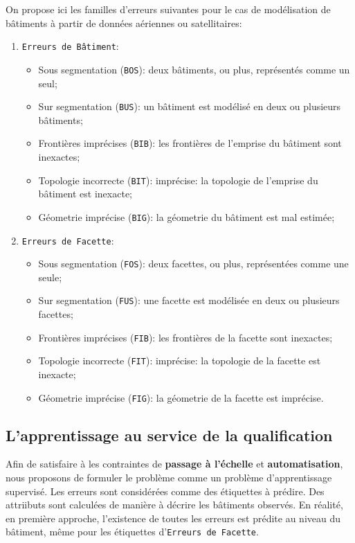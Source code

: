         On propose ici les familles d'erreurs suivantes pour le cas de modélisation de bâtiments à partir de données aériennes ou satellitaires:

        \begin{enumerate}
            \item \texttt{Erreurs de Bâtiment}:
            \begin{itemize}
                \item Sous segmentation (\texttt{BOS}): deux bâtiments, ou plus, représentés comme un seul;
                \item Sur segmentation (\texttt{BUS}): un bâtiment est modélisé en deux ou plusieurs bâtiments;
                \item Frontières imprécises (\texttt{BIB}): les frontières de l'emprise du bâtiment sont inexactes;
                \item Topologie incorrecte (\texttt{BIT}): imprécise: la topologie de l'emprise du bâtiment est inexacte;
                \item Géometrie imprécise (\texttt{BIG}): la géometrie du bâtiment est mal estimée;
            \end{itemize}
            \item \texttt{Erreurs de Facette}:
            \begin{itemize}
                \item Sous segmentation (\texttt{FOS}): deux facettes, ou plus, représentées comme une seule;
                \item Sur segmentation (\texttt{FUS}): une facette est modélisée en deux ou plusieurs facettes;
                \item Frontières imprécises (\texttt{FIB}): les frontières de la facette sont inexactes;
                \item Topologie incorrecte (\texttt{FIT}): imprécise: la topologie de la facette est inexacte;
                \item Géometrie imprécise (\texttt{FIG}): la géometrie de la facette est imprécise.
            \end{itemize}
        \end{enumerate}

    \subsection*{L'apprentissage au service de la qualification}
        Afin de satisfaire à les contraintes de \textbf{passage à l'échelle} et \textbf{automatisation}, nous proposons de formuler le problème comme un problème d'apprentissage supervisé.
        Les erreurs sont considérées comme des étiquettes à prédire.
        Des attriibuts sont calculées de manière à décrire les bâtiments observés.
        En réalité, en première approche, l'existence de toutes les erreurs est prédite au niveau du bâtiment, même pour les étiquettes d'\texttt{Erreurs de Facette}.\\
        
